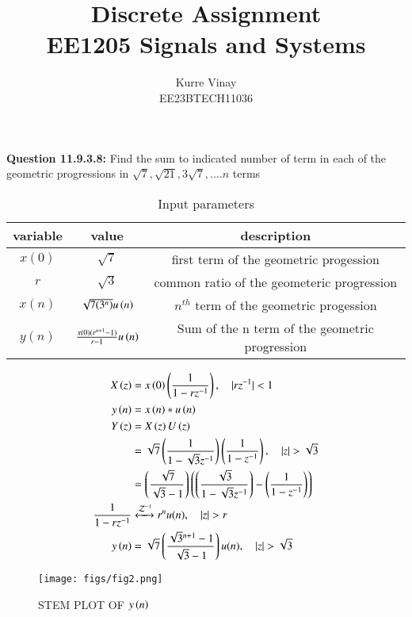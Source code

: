 \documentclass[a4,12pt,onecolumn]{IEEEtran}
\begin{document}
\title{
\Huge\textbf{Discrete Assignment}\\
\Huge\textbf{EE1205} Signals and Systems\\
}
\large\author{Kurre Vinay\\EE23BTECH11036}
\maketitle
\textbf{Question 11.9.3.8:}
Find the sum to indicated number of term in each of the geometric progressions in $\sqrt{7} ,\sqrt{21} , 3\sqrt{7}, ....n$ terms\\
\solution
\fi
\begin{table}[h!]
 \begin{center}
\begin{tabular}{|c|c|c|}
   \hline
   variable&value&description  \\
   \hline
   $x(0)$ & $ \sqrt{7} $& first term of the geometric progession\\
   \hline
   $r$ & $\sqrt{3}$ & common ratio of the geometeric progression\\
   \hline
   $x(n)$ & $\sqrt{7(3^{n})}u\left(n\right)$& $n^{th}$ term of the geometric progession\\
   \hline
   $y(n)$ &$\frac{x(0)(r^{n+1}-1)}{r-1}u\left(n\right)$ &Sum of the n term of the geometric progression\\
   \hline 
\end{tabular}
\caption{Input parameters}
\end{center}
\end{table}

\begin{align}
X\brak{z} &= x\brak{0}\brak{\frac{1}{1-rz^{-1}}}, \quad{|rz^{-1}|<1}\\
y\brak{n} &= x\brak{n}*u\brak{n}\\
Y\brak{z} &= X\brak{z}U\brak{z}\\
&=\sqrt{7}\brak{\frac{1}{1-\sqrt{3}z^{-1}}}\brak{\frac{1}{1-z^{-1}}} ,\quad{|z|>\sqrt{3}}\\
&=\brak{\frac{\sqrt{7}}{\sqrt{3}-1}}\brak{\brak{\frac{\sqrt{3}}{1-\sqrt{3}z^{-1}}}-\brak{\frac{1}{1-z^{-1}}}}\\
\frac{1}{1-rz^{-1}} &\xleftrightarrow{\mathcal{Z}^{-1}}  r^nu(n), \quad{|z|>r}\\
y\brak{n} &= \sqrt{7}\brak{\frac{\sqrt{3}^{n+1}-1}{\sqrt{3}-1}}u(n) , \quad{|z|>\sqrt{3}}
\end{align}

\begin{figure}[ht!]
\texttt{[image: figs/fig2.png]}
\caption{\large{STEM PLOT OF $y\left(n\right)$}}
\end{figure}
\end{document}
